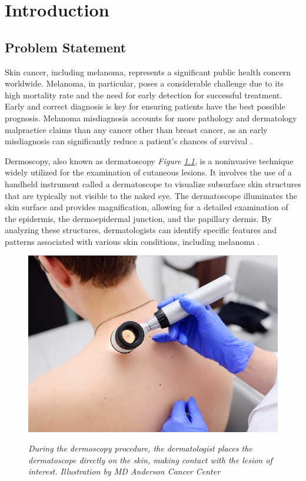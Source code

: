 \chapter{Introduction}
\label{cap:intro}

\section{Problem Statement}

Skin cancer, including melanoma, represents a significant public health concern
worldwide. Melanoma, in particular, poses a considerable challenge due to its
high mortality rate and the need for early detection for successful treatment.
Early and correct diagnosis is key for ensuring patients have the best possible
prognosis. Melanoma misdiagnosis accounts for more pathology and dermatology
malpractice claims than any cancer other than breast cancer, as an early
misdiagnosis can significantly reduce a patient’s chances of survival
\cite{Melanoma}. \newline

Dermoscopy, also known as dermatoscopy \textit{Figure
\ref{fig:procedure_dermoscopy}}, is a noninvasive technique widely utilized for
the examination of cutaneous lesions. It involves the use of a handheld
instrument called a dermatoscope to visualize subsurface skin structures that
are typically not visible to the naked eye. The dermatoscope illuminates the
skin surface and provides magnification, allowing for a detailed examination of
the epidermis, the dermoepidermal junction, and the papillary dermis. By
analyzing these structures, dermatologists can identify specific features and
patterns associated with various skin conditions, including melanoma
\cite{Dermoscopy}.

\begin{figure}[htb] \centering
  \includegraphics[width=6.5 cm]{imatges/introduction/medical_procedure_dermastocopy.jpeg}
  \caption[Dermoscopy Procedure]{\textit{During the dermoscopy procedure, the dermatologist places the dermatoscope directly on the skin, making contact with the lesion of interest. Illustration by MD Anderson Cancer Center}}
  {\label{fig:procedure_dermoscopy}}
\end{figure}

